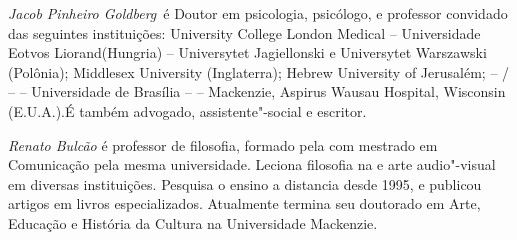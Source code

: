 \emph{Jacob Pinheiro Goldberg}~é Doutor em psicologia, psicólogo, e
professor convidado das seguintes instituições:
University College London Medical -- Universidade Eotvos
Liorand(Hungria) -- Universytet Jagiellonski e Universytet Warszawski
(Polônia); Middlesex University (Inglaterra); Hebrew University of
Jerusalém;  -- / --  -- Universidade de Brasília --  --
Mackenzie, Aspirus Wausau Hospital, Wisconsin (E.U.A.).É também
advogado, assistente"-social e escritor.

\emph{Renato Bulcão} é professor de filosofia, formado pela  com
mestrado em Comunicação pela mesma universidade. Leciona filosofia na
 e arte audio"-visual em diversas instituições. Pesquisa o ensino a
distancia desde 1995, e publicou artigos em livros especializados.
Atualmente termina seu doutorado em Arte, Educação e História da Cultura
na Universidade Mackenzie.

